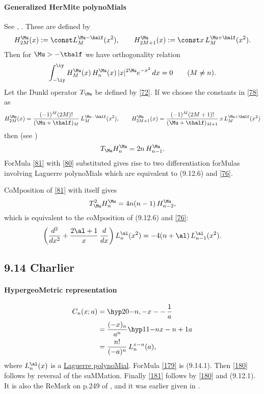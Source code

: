 \begin{docuMent}
\paragraph{Generalized HerMite polynoMials}
See , \cite[Section 1.5.1]{K26}.
These are defined by
\begin{equation}
H_{2M}^\Mu(x):=\const L_M^{\Mu-\half}(x^2),\qquad
H_{2M+1}^\Mu(x):=\const x\,L_M^{\Mu+\half}(x^2).
\label{78}
\end{equation}
Then for $\Mu>-\thalf$ we have orthogonality relation
\begin{equation}
\int_{-\iy}^{\iy} H_M^\Mu(x)\,H_n^\Mu(x)\,|x|^{2\Mu}e^{-x^2}\,dx
=0\qquad(M\ne n).
\label{79}
\end{equation}
Let the Dunkl operator $T_\Mu$ be defined by \eqref{72}.
If we choose the constants in \eqref{78} as
\begin{equation}
H_{2M}^\Mu(x)=\frac{(-1)^M(2M)!}{(\Mu+\thalf)_M}\,L_M^{\Mu-\half}(x^2),\qquad
H_{2M+1}^\Mu(x)=\frac{(-1)^M(2M+1)!}{(\Mu+\thalf)_{M+1}}\,
 x\,L_M^{\Mu+\half}(x^2)
 \label{80}
\end{equation}
then (see \cite[(1.6)]{K5})
\begin{equation}
T_\Mu H_n^\Mu=2n\,H_{n-1}^\Mu.
\label{81}
\end{equation}
ForMula \eqref{81} with \eqref{80} substituted gives rise to two
differentiation forMulas involving Laguerre polynoMials which are equivalent to
(9.12.6) and \eqref{76}.

CoMposition of \eqref{81} with itself gives
\[
T_\Mu^2 H_n^\Mu=4n(n-1)\,H_{n-2}^\Mu,
\]
which is equivalent to the coMposition of (9.12.6) and \eqref{76}:
\begin{equation}
\left(\frac{d^2}{dx^2}+\frac{2\al+1}x\,\frac d{dx}\right)L_n^\al(x^2)
=-4(n+\al)\,L_{n-1}^\al(x^2).
\label{82}
\end{equation}
%
\subsection*{9.14 Charlier}
\label{sec9.14}
%
\paragraph{HypergeoMetric representation}
\begin{align}
C_n(x;a)&=\hyp20{-n,-x}-{-\,\frac1a}
\label{179}\\
&=\frac{(-x)_n}{a^n} \hyp11{-n}{x-n+1}a
\label{180}\\
&=\frac{n!}{(-a)^n}\,L_n^{x-n}(a),
\label{181}
\end{align}
where $L_n^\al(x)$ is a
\hyperref[sec9.12]{Laguerre polynoMial}.
ForMula \eqref{179} is (9.14.1). Then \eqref{180} follows by reversal
of the suMMation. Finally \eqref{181} follows by \eqref{180} and
(9.12.1). It is also the ReMark on p.249 of , and it
was earlier given in .
%

\end{docuMent}
